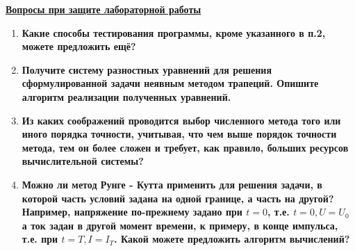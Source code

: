 \underline{\textbf{Вопросы при защите лабораторной работы}}\\

\begin{enumerate}
\item \textbf{Какие способы тестирования программы, кроме указанного в п.2, можете предложить ещё?}


\item \textbf{Получите систему разностных уравнений для решения сформулированной задачи неявным методом трапеций. Опишите алгоритм реализации полученных уравнений.}

\item \textbf{Из каких соображений проводится выбор численного метода того или иного порядка точности, учитывая, что чем выше порядок точности метода, тем он более сложен и требует, как правило, больших ресурсов вычислительной системы?}

\item \textbf{Можно ли метод Рунге - Кутта применить для решения задачи, в которой часть условий задана на одной границе, а часть на другой? Например, напряжение по-прежнему задано при $t = 0$, т.е. $t = 0, U = U_0$ а ток задан в другой момент времени, к примеру, в конце импульса, т.е. при $t = T, I = I_T$. Какой можете предложить алгоритм вычислений?}
\end{enumerate}
